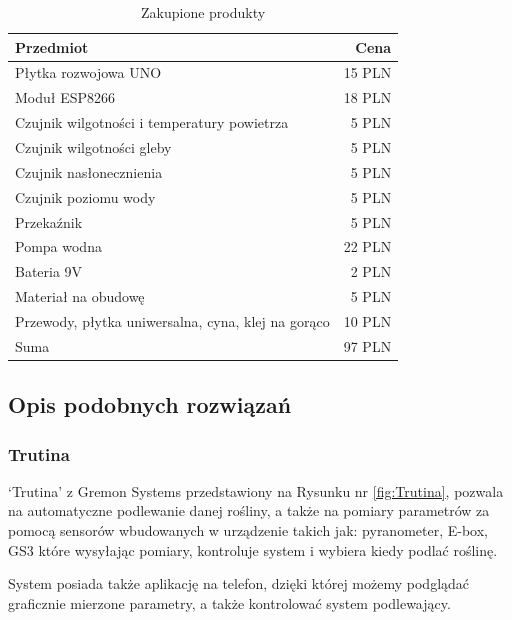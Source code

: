 \documentclass[12pt]{article}
\begin{document}
\begin{table}[!h]
\centering
\begin{tabular}{l|r}
Przedmiot & Cena \\\hline

Płytka rozwojowa UNO & 15 PLN \\

Moduł ESP8266 & 18 PLN \\

Czujnik wilgotności i temperatury powietrza & 5 PLN \\

Czujnik wilgotności gleby & 5 PLN \\

Czujnik nasłonecznienia & 5 PLN \\

Czujnik poziomu wody & 5 PLN \\

Przekaźnik & 5 PLN \\

Pompa wodna & 22 PLN \\

Bateria 9V & 2 PLN \\

Materiał na obudowę & 5 PLN \\

Przewody, płytka uniwersalna, cyna, klej na gorąco & 10 PLN 
\\ \hline
Suma & 97 PLN

\end{tabular}
\caption{\label{tab:widgets}Zakupione produkty}
\end{table}
\newpage
\subsection{Opis podobnych rozwiązań }
\subsubsection{Trutina}
‘Trutina’ z Gremon Systems przedstawiony na Rysunku nr \ref{fig:Trutina},
 pozwala na automatyczne podlewanie danej rośliny, a także na pomiary parametrów za pomocą sensorów wbudowanych w urządzenie takich jak: pyranometer, E-box, GS3 które wysyłając pomiary, kontroluje system i wybiera kiedy podlać roślinę. 

System posiada także aplikację na telefon, dzięki której możemy podglądać graficznie mierzone parametry, a także kontrolować system podlewający. 
\end{document}
